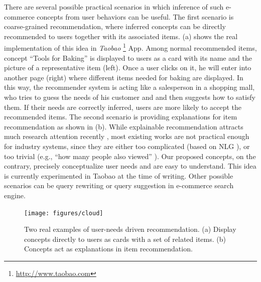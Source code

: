 There are several possible practical scenarios in which 
inference of such e-commerce concepts from user behaviors can be useful. 
The first scenario is coarse-grained recommendation,
where inferred concepts can be directly recommended to users 
together with its associated items.
(a) shows the real implementation of this idea in 
\textit{Taobao} \footnote{\url{http://www.taobao.com}} App.
Among normal recommended items, 
concept ``Tools for Baking'' is displayed to users as a card with its name and the picture of a representative item (left).
Once a user clicks on it, he will enter into another page (right) where different 
items needed for baking are displayed.
In this way, the recommender system is acting like a salesperson in a shopping mall, 
who tries to guess the needs of his customer and and then suggests how to satisfy
them. If their needs are correctly inferred, users are more likely to accept 
the recommended items.
The second scenario is providing explanations for item recommendation as 
shown in (b).
While explainable recommendation attracts much research attention 
recently \cite{zhang2018explainable}, 
most existing works are not practical enough for industry systems,
since they are either too complicated 
(based on NLG \cite{zanker2010knowledgeable,cleger2012explaining}), or too trivial 
(e.g., ``how many people also viewed'' \cite{costa2018automatic,li2017neural}).
Our proposed concepts, on the contrary, precisely conceptualize user needs and are
easy to understand. This idea is currently experimented in Taobao at the time of 
writing. Other possible scenarios can be query rewriting or query suggestion in e-commerce search engine.

\begin{figure}[th]
	\centering
	\texttt{[image: figures/cloud]}
	\caption{Two real examples of user-needs driven recommendation.
		(a) Display concepts directly to users as cards with a set of related items. (b) Concepts act as explanations in item recommendation.
	}
	\label{fig:cloud}
\end{figure}

